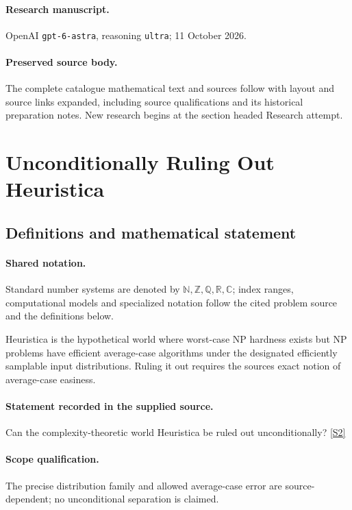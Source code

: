 \documentclass[11pt]{article}
\begin{document}
\paragraph{Research manuscript.} OpenAI \texttt{gpt-6-astra}, reasoning \texttt{ultra}; 11 October 2026.
\paragraph{Preserved source body.} The complete catalogue mathematical text and sources follow with layout and source links expanded, including source qualifications and its historical preparation notes. New research begins at the section headed Research attempt.

\section{Unconditionally Ruling Out Heuristica}\label{statement}

\subsection{Definitions and mathematical statement}

\paragraph{Shared notation.}Standard number systems are denoted by $\mathbb N,\mathbb Z,\mathbb Q,\mathbb R,\mathbb C$; index ranges, computational models and specialized notation follow the cited problem source and the definitions below.


Heuristica is the hypothetical world where worst-case NP hardness exists but NP problems have efficient average-case algorithms under the designated efficiently samplable input distributions. Ruling it out requires the source\textquotesingle s exact notion of average-case easiness.
\paragraph{Statement recorded in the supplied source.}
Can the complexity-theoretic world Heuristica be ruled out unconditionally? \href{https://doi.org/10.4171/owr/2024/27}{[S2]}
\paragraph{Scope qualification.}
The precise distribution family and allowed average-case error are source-dependent; no unconditional separation is claimed.
\end{document}
